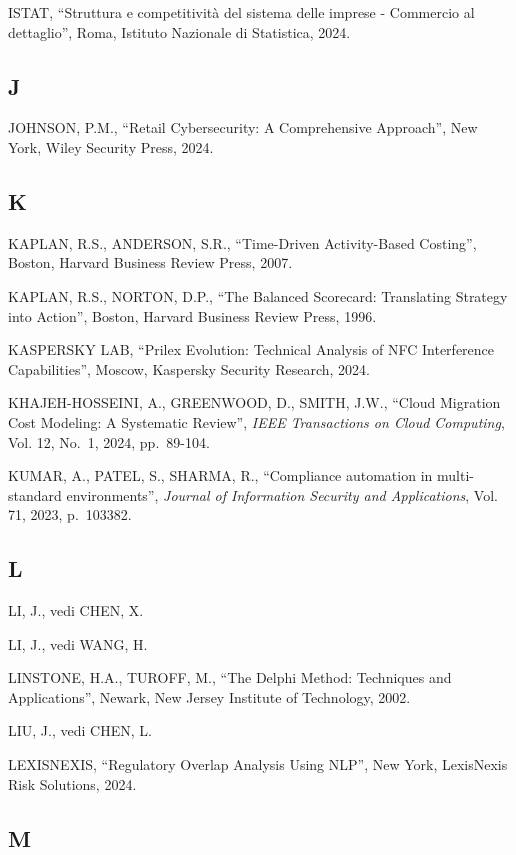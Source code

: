 \documentclass{report}
\begin{document}
ISTAT, ``Struttura e competitività del sistema delle imprese - Commercio
al dettaglio'', Roma, Istituto Nazionale di Statistica, 2024.

\subsection{J}\label{j-1}

JOHNSON, P.M., ``Retail Cybersecurity: A Comprehensive Approach'', New
York, Wiley Security Press, 2024.

\subsection{K}\label{k-1}

KAPLAN, R.S., ANDERSON, S.R., ``Time-Driven Activity-Based Costing'',
Boston, Harvard Business Review Press, 2007.

KAPLAN, R.S., NORTON, D.P., ``The Balanced Scorecard: Translating
Strategy into Action'', Boston, Harvard Business Review Press, 1996.

KASPERSKY LAB, ``Prilex Evolution: Technical Analysis of NFC
Interference Capabilities'', Moscow, Kaspersky Security Research, 2024.

KHAJEH-HOSSEINI, A., GREENWOOD, D., SMITH, J.W., ``Cloud Migration Cost
Modeling: A Systematic Review'', \emph{IEEE Transactions on Cloud
Computing}, Vol. 12, No.~1, 2024, pp.~89-104.

KUMAR, A., PATEL, S., SHARMA, R., ``Compliance automation in
multi-standard environments'', \emph{Journal of Information Security and
Applications}, Vol. 71, 2023, p.~103382.

\subsection{L}\label{l-1}

LI, J., vedi CHEN, X.

LI, J., vedi WANG, H.

LINSTONE, H.A., TUROFF, M., ``The Delphi Method: Techniques and
Applications'', Newark, New Jersey Institute of Technology, 2002.

LIU, J., vedi CHEN, L.

LEXISNEXIS, ``Regulatory Overlap Analysis Using NLP'', New York,
LexisNexis Risk Solutions, 2024.

\subsection{M}\label{m-1}
\end{document}
